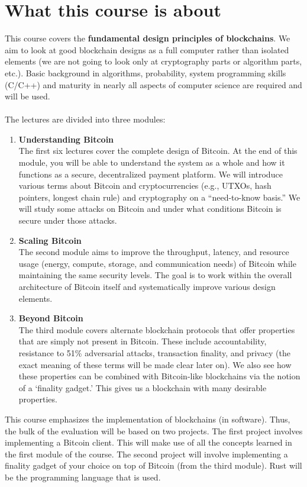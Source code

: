 \section{What this course is about}
This course covers the \textbf{fundamental design principles of blockchains}. We aim to look at good blockchain designs as a full computer rather than isolated elements (we are not going to look only at cryptography parts or algorithm parts, etc.).
Basic background in algorithms, probability, system programming skills (C/C++) and maturity in nearly all aspects of computer science are required and will be used.\\\\
The lectures are divided into three modules:
\begin{enumerate}
    \item \textbf{Understanding Bitcoin}\\
    The first six lectures cover the complete design of Bitcoin. At the end of this module, you will be able to understand the system as a whole and how it functions as a  secure, decentralized payment platform. We will introduce various terms about Bitcoin and cryptocurrencies (e.g., UTXOs, hash pointers, longest chain rule) and cryptography on a “need-to-know basis.” We will study some attacks on Bitcoin and under what conditions Bitcoin is secure under those attacks.
    \item \textbf{Scaling Bitcoin}\\
    The second module aims to improve the throughput, latency, and resource usage
    (energy, compute, storage, and communication needs) of Bitcoin while maintaining the same security
    levels. The goal is to work within the overall architecture of Bitcoin itself and systematically improve
    various design elements.
    \item \textbf{Beyond Bitcoin}\\
    The third module covers alternate blockchain protocols that offer properties
    that are simply not present in Bitcoin. These include accountability, resistance to 51\% adversarial
    attacks, transaction finality, and privacy (the exact meaning of these terms will be made clear later
    on). We also see how these properties can be combined with Bitcoin-like blockchains via the notion
    of a ‘finality gadget.’ This gives us a blockchain with many desirable properties.
\end{enumerate}
This course emphasizes the implementation of blockchains (in software).
Thus, the bulk of the evaluation will be based on two projects. The first project involves implementing
a Bitcoin client. This will make use of all the concepts learned in the first module of the course.
The second project will involve implementing a finality gadget of your choice on top of Bitcoin (from
the third module). Rust will be the programming language that is used.

